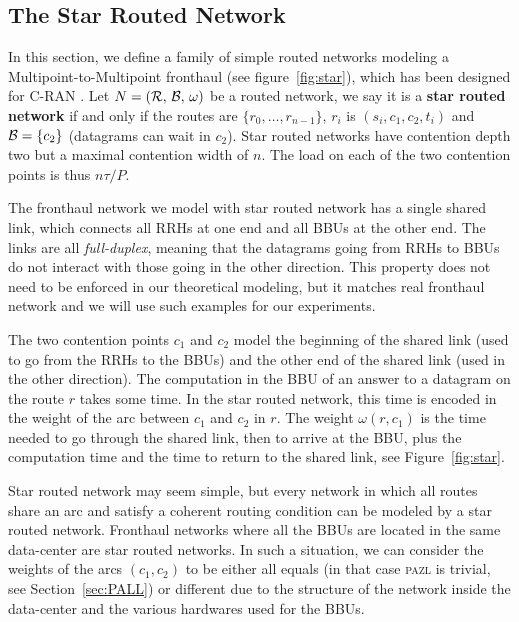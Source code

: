 \documentclass[a4paper,10pt]{journal}
\newcommand\pazl{\textsc{pazl}\xspace}
\begin{document}
    \subsection{The Star Routed Network} \label{sec:star_routed_network}
  
	In this section, we define a family of simple routed networks modeling a Multipoint-to-Multipoint fronthaul (see figure~\ref{fig:star}), which has been designed for C-RAN \cite{tayq2017real}. Let $N = (\cal{R},\,\cal{B},\,\omega)$ be a routed network, we say it is a \textbf{star routed network} if and only if the routes are $\{r_0,\dots,r_{n-1}\}$, $r_i$ is $(s_i,c_1,c_2,t_i)$ and ${\cal B} = \{ c_2 \}$ (datagrams can wait in $c_2$). Star routed networks have contention depth two but a maximal contention width of $n$. The load on each of the two contention points is thus $n\tau / P$.

	The fronthaul network we model with star routed network has a single shared link, which connects all RRHs at one end and all BBUs at the other end. The links are all \emph{full-duplex}, meaning that the datagrams going from RRHs to BBUs do not interact with those going in the other direction. 
	 This property does not need to be enforced in our theoretical modeling, but it matches real fronthaul network and we will use such examples for our experiments. 
	 
	The two contention points $c_1$ and $c_2$ model the beginning of the shared link (used to go from the RRHs to the BBUs) and the other end of the shared link (used in the other direction). 
	The computation in the BBU of an answer to a datagram on the route $r$ takes some time.
	In the star routed network, this time is encoded in the weight of the arc between $c_1$ and $c_2$ in $r$. The weight $\omega(r,c_1)$ is the time needed to go through the shared link, then to arrive at the BBU, plus the computation time and the time to return to the shared link, see Figure~\ref{fig:star}.

	Star routed network may seem simple, but every network in which all routes share an arc and satisfy a coherent routing condition can be modeled by a star routed network.
	Fronthaul networks where all the BBUs are located in the same data-center are star routed networks. In such a situation, we can consider the weights of the arcs $(c_1,c_2)$ to be either all equals (in that case \pazl is trivial, see Section~\ref{sec:PALL}) or different due to the structure of the network inside the data-center and the various hardwares used for the BBUs. 
\end{document}
